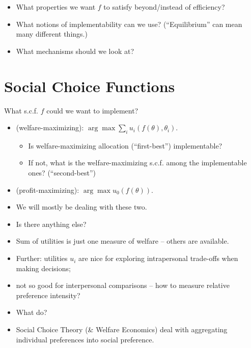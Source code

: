 \documentclass[english,handout]{beamer}		%
\def\lyxframeend{} %
\begin{document}
\begin{itemize}
	\item What properties we want $f$ to satisfy beyond/instead of efficiency?
	\item What notions of implementability can we use? (``Equilibrium'' can mean many different things.)
	\item What mechanisms should we look at?
\end{itemize}
\lyxframeend





\section{Social Choice Functions}


What s.c.f. $f$ could we want to implement?
\begin{itemize}
	\item {} (welfare-maximizing): $\arg \max \sum_i u_i(f(\theta),\theta_i)$.
	\begin{itemize}
		\item Is welfare-maximizing allocation (``first-best'') implementable?
		\item If not, what is the welfare-maximizing s.c.f. among the implementable ones? (``second-best'')
	\end{itemize}
	\pause
	\item {} (profit-maximizing): $\arg \max u_0(f(\theta))$.
	\pause
	\item We will mostly be dealing with these two.
	\item Is there anything else?
\end{itemize}
\lyxframeend


\begin{itemize}
	\item Sum of utilities is just one measure of welfare -- others are available.
	\item Further: utilities $u_i$ are nice for exploring intrapersonal trade-offs when making decisions;
	\item not so good for interpersonal comparisons -- how to measure relative preference intensity?
	\item What do?
	\pause
	\item Social Choice Theory (\& Welfare Economics) deal with aggregating individual preferences into social preference.
\end{itemize}
\lyxframeend
\end{document}

